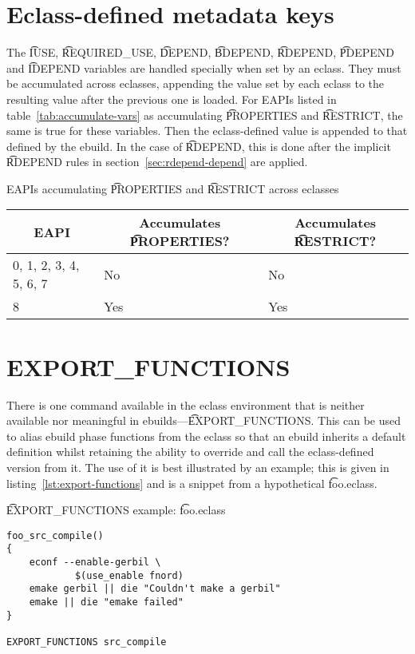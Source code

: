 \section{Eclass-defined metadata keys}

 The \t{IUSE}, \t{REQUIRED_USE}, \t{DEPEND}, \t{BDEPEND}, \t{RDEPEND},
\t{PDEPEND} and \t{IDEPEND} variables are handled specially when set by an eclass. They must be
accumulated across eclasses, appending the value set by each eclass to the resulting value after
the previous one is loaded. For EAPIs listed in table~\ref{tab:accumulate-vars} as accumulating
\t{PROPERTIES} and \t{RESTRICT}, the same is true for these variables. Then the eclass-defined
value is appended to that defined by the ebuild. In the case of \t{RDEPEND}, this is done after
the implicit \t{RDEPEND} rules in section~\ref{sec:rdepend-depend} are applied.

\begin{centertable}{EAPIs accumulating \t{PROPERTIES} and \t{RESTRICT} across eclasses}
    \label{tab:accumulate-vars}
    \begin{tabular}{lll}
      \toprule
      \multicolumn{1}{c}{\textbf{EAPI}} &
      \multicolumn{1}{c}{\textbf{Accumulates \t{PROPERTIES}?}} &
      \multicolumn{1}{c}{\textbf{Accumulates \t{RESTRICT}?}} \\
      \midrule
      0, 1, 2, 3, 4, 5, 6, 7  & No  & No  \\
      8                       & Yes & Yes \\
      \bottomrule
    \end{tabular}
\end{centertable}

\section{EXPORT_FUNCTIONS}

There is one command available in the eclass environment that is neither available nor meaningful
in ebuilds---\t{EXPORT_FUNCTIONS}\@. This can be used to alias ebuild phase functions from the
eclass so that an ebuild inherits a default definition whilst retaining the ability to override and
call the eclass-defined version from it. The use of it is best illustrated by an example; this is
given in listing~\ref{lst:export-functions} and is a snippet from a hypothetical \t{foo.eclass}.

\begin{listing}
\caption{\t{EXPORT_FUNCTIONS} example: \t{foo.eclass}} \label{lst:export-functions}
\begin{verbatim}
foo_src_compile()
{
    econf --enable-gerbil \
            $(use_enable fnord)
    emake gerbil || die "Couldn't make a gerbil"
    emake || die "emake failed"
}

EXPORT_FUNCTIONS src_compile
\end{verbatim}
\end{listing}

